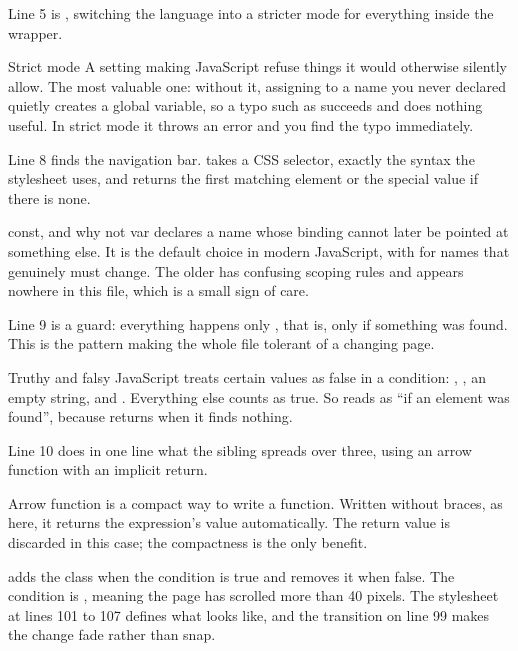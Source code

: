 Line 5 is , switching the language into a stricter mode for
everything inside the wrapper.

\begin{jargon}{Strict mode}
A setting making JavaScript refuse things it would otherwise silently allow. The
most valuable one: without it, assigning to a name you never declared quietly
creates a global variable, so a typo such as  succeeds and does
nothing useful. In strict mode it throws an error and you find the typo
immediately.
\end{jargon}

Line 8 finds the navigation bar.  takes a CSS selector,
exactly the syntax the stylesheet uses, and returns the first matching element or
the special value  if there is none.

\begin{jargon}{const, and why not var}
 declares a name whose binding cannot later be pointed at something
else. It is the default choice in modern JavaScript, with  for names that
genuinely must change. The older  has confusing scoping rules and appears
nowhere in this file, which is a small sign of care.
\end{jargon}

Line 9 is a guard: everything happens only , that is, only if
something was found. This is the pattern making the whole file tolerant of a
changing page.

\begin{jargon}{Truthy and falsy}
JavaScript treats certain values as false in a condition: , , an
empty string,  and . Everything else counts as true. So
 reads as ``if an element was found'', because
 returns  when it finds nothing.
\end{jargon}

Line 10 does in one line what the sibling spreads over three, using an arrow
function with an implicit return.

\begin{jargon}{Arrow function}
 is a compact way to write a function. Written without
braces, as here, it returns the expression's value automatically. The return value
is discarded in this case; the compactness is the only benefit.
\end{jargon}

 adds the class when the condition is
true and removes it when false. The condition is , meaning
the page has scrolled more than 40 pixels. The stylesheet at lines 101 to 107
defines what  looks like, and the transition on line 99 makes the
change fade rather than snap.

